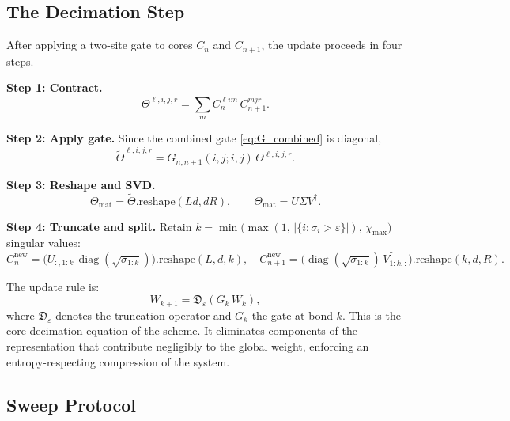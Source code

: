 \documentclass[11pt]{article}
\theoremstyle{definition}
\DeclareMathOperator{\diag}{diag}
\begin{document}
\subsection{The Decimation Step}

After applying a two-site gate to cores $C_n$ and $C_{n+1}$, the update
proceeds in four steps.

\textbf{Step 1: Contract.}
\begin{equation}
  \Theta^{\ell,i,j,r} = \sum_m C_n^{\ell i m}\,C_{n+1}^{m j r}.
\end{equation}

\textbf{Step 2: Apply gate.}
Since the combined gate \eqref{eq:G_combined} is diagonal,
\begin{equation}
  \tilde\Theta^{\ell,i,j,r}
  = G_{n,n+1}(i,j;i,j)\,\Theta^{\ell,i,j,r}.
  \label{eq:G_combined}
\end{equation}

\textbf{Step 3: Reshape and SVD.}
\begin{equation}
  \Theta_{\mathrm{mat}} = \tilde\Theta.\mathrm{reshape}(Ld, dR),
  \qquad
  \Theta_{\mathrm{mat}} = U\Sigma V^\dagger.
\end{equation}

\textbf{Step 4: Truncate and split.}
Retain $k = \min\!\bigl(\max(1,\,|\{i:\sigma_i>\varepsilon\}|),\,
\chi_{\max}\bigr)$ singular values:
\begin{equation}
  C_n^{\mathrm{new}} =
    \bigl(U_{:,1:k}\,\diag(\sqrt{\sigma_{1:k}})\bigr)
    .\mathrm{reshape}(L,d,k),
  \quad
  C_{n+1}^{\mathrm{new}} =
    \bigl(\diag(\sqrt{\sigma_{1:k}})\,V^\dagger_{1:k,:}\bigr)
    .\mathrm{reshape}(k,d,R).
\end{equation}

The update rule is:
\begin{equation}
  W_{k+1} = \mathfrak{D}_\varepsilon(G_k\,W_k),
  \label{eq:update_rule}
\end{equation}
where $\mathfrak{D}_\varepsilon$ denotes the truncation operator and $G_k$ the
gate at bond $k$. This is the core decimation equation of the scheme. It
eliminates components of the representation that contribute negligibly to the
global weight, enforcing an entropy-respecting compression of the system.

\subsection{Sweep Protocol}
\end{document}
